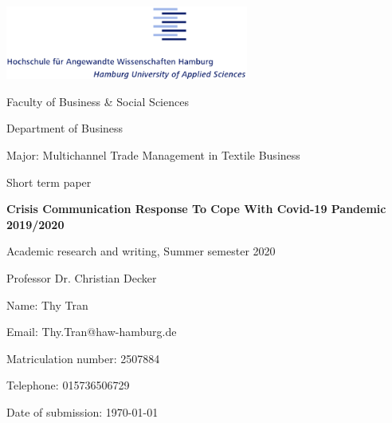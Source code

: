 \begin{titlepage}
	\begin{flushright}
		\includegraphics[width=0.6\textwidth]{HAW_logo.png}

		Faculty of Business \& Social Sciences 

		Department of Business

		Major: Multichannel Trade Management in Textile Business
	\end{flushright}
	
	\vspace{3cm}

	\begin{center}
		\large{Short term paper}

		\huge{\textbf{Crisis Communication Response To Cope With Covid-19 Pandemic 2019/2020}}

		\vspace{1cm}
		
		\normalsize{Academic research and writing, Summer semester 2020}

		\normalsize{Professor Dr. Christian Decker}
	\end{center}

	\vspace{5cm}

	\begin{flushleft}
		Name: Thy Tran

		Email: Thy.Tran@haw-hamburg.de

		Matriculation number: 2507884

		Telephone: 015736506729

		Date of submission: \today
	\end{flushleft}
\end{titlepage}
